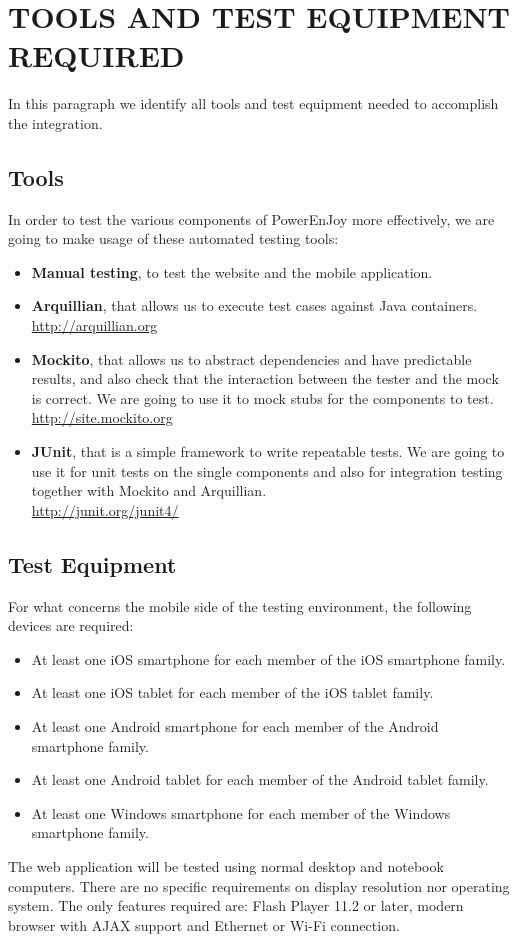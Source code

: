 \section{TOOLS AND TEST EQUIPMENT \\REQUIRED}
In this paragraph we identify  all  tools  and  test  equipment  needed  to  accomplish  the  integration.  

\subsection{Tools}
In order to test the various components of PowerEnJoy more effectively, we are going to make usage of these automated testing tools:
\begin{itemize}
	\item \textbf{Manual testing}, to test the website and the mobile application.
	\item \textbf{Arquillian}, that allows us to execute test cases against Java containers. \\ \url{http://arquillian.org}
	\item \textbf{Mockito}, that allows us to abstract dependencies and have predictable results, and also check that the interaction between the tester and the mock is correct. We are going to use it to mock stubs for the components to test. \\ \url{http://site.mockito.org}
	\item \textbf{JUnit}, that is a simple framework to write repeatable tests. We are going to use it for unit tests on the single components and also for integration testing together with Mockito and Arquillian. \\ \url{http://junit.org/junit4/}
\end{itemize}
\newpage
\subsection{Test Equipment}
For what concerns the mobile side of the testing environment, the following devices are required:
\begin{itemize}
	\item At least one iOS smartphone for each member of the iOS smartphone family.
	\item At least one iOS tablet for each member of the iOS tablet family.
	\item At least one Android smartphone for each member of the Android smartphone family.
	\item At least one Android tablet for each member of the Android tablet family.
	\item At least one Windows smartphone for each member of the Windows smartphone family.
\end{itemize}
The web application will be tested using normal desktop and notebook computers. There are no specific requirements on display resolution nor operating system. The only features required are: Flash Player 11.2 or later, modern browser with AJAX support and Ethernet or Wi-Fi connection.

